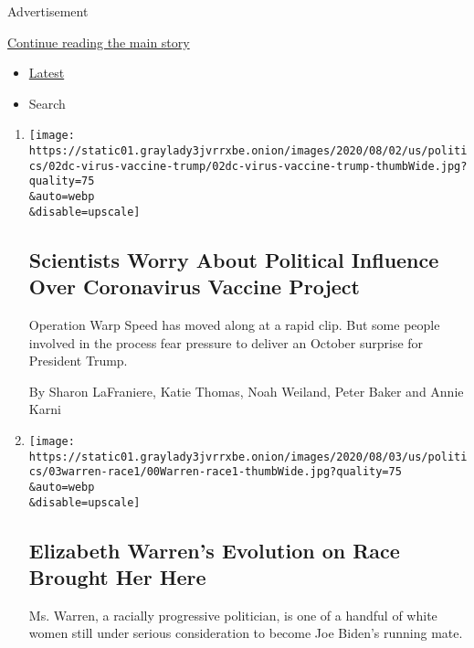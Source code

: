 Advertisement

\protect\hyperlink{after-mid1}{Continue reading the main story}

\begin{itemize}
\tightlist
\item
  \protect\hyperlink{stream-panel}{Latest}
\item
  Search
\end{itemize}

\begin{enumerate}
\def\labelenumi{\arabic{enumi}.}
\item
  \href{/2020/08/02/us/politics/coronavirus-vaccine.html}{}

  \texttt{[image: https://static01.graylady3jvrrxbe.onion/images/2020/08/02/us/politics/02dc-virus-vaccine-trump/02dc-virus-vaccine-trump-thumbWide.jpg?quality=75\\\&auto=webp\\\&disable=upscale]}

  \hypertarget{scientists-worry-about-political-influence-over-coronavirus-vaccine-project}{%
  \subsection{Scientists Worry About Political Influence Over
  Coronavirus Vaccine
  Project}\label{scientists-worry-about-political-influence-over-coronavirus-vaccine-project}}

  Operation Warp Speed has moved along at a rapid clip. But some people
  involved in the process fear pressure to deliver an October surprise
  for President Trump.

  By Sharon LaFraniere, Katie Thomas, Noah Weiland, Peter Baker and
  Annie Karni
\item
  \href{/2020/08/02/us/politics/elizabeth-warren-biden-vice-president.html}{}

  \texttt{[image: https://static01.graylady3jvrrxbe.onion/images/2020/08/03/us/politics/03warren-race1/00Warren-race1-thumbWide.jpg?quality=75\\\&auto=webp\\\&disable=upscale]}

  \hypertarget{elizabeth-warrens-evolution-on-race-brought-her-here}{%
  \subsection{Elizabeth Warren's Evolution on Race Brought Her
  Here}\label{elizabeth-warrens-evolution-on-race-brought-her-here}}

  Ms. Warren, a racially progressive politician, is one of a handful of
  white women still under serious consideration to become Joe Biden's
  running mate.


\end{enumerate}
